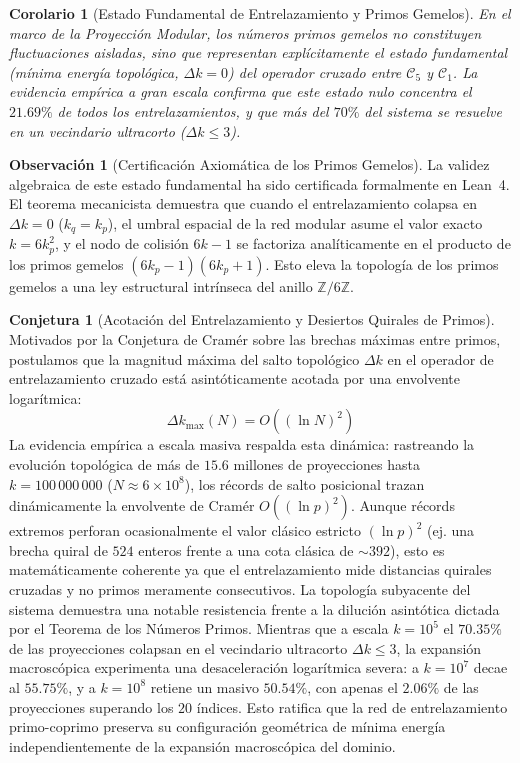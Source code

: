 \documentclass{article}
\numberwithin{equation}{section}
\theoremstyle{plain}
\newtheorem{corollary}[theorem]{Corolario}
\theoremstyle{definition}
\newtheorem{remark}[theorem]{Observación}
\newtheorem{conjecture}[theorem]{Conjetura}
\begin{document}
\begin{corollary}[Estado Fundamental de Entrelazamiento y Primos Gemelos]
\label{cor:estado-fundamental-gemelos}
En el marco de la Proyección Modular, los números primos gemelos no constituyen fluctuaciones aisladas, sino que representan explícitamente el \textit{estado fundamental} (mínima energía topológica, $\Delta k = 0$) del operador cruzado entre $\mathcal{C}_5$ y $\mathcal{C}_1$. La evidencia empírica a gran escala confirma que este estado nulo concentra el $21.69\%$ de todos los entrelazamientos, y que más del $70\%$ del sistema se resuelve en un vecindario ultracorto ($\Delta k \le 3$).
\end{corollary}

\begin{remark}[Certificación Axiomática de los Primos Gemelos]
La validez algebraica de este estado fundamental ha sido certificada formalmente en Lean~4. El teorema mecanicista demuestra que cuando el entrelazamiento colapsa en $\Delta k = 0$ ($k_q = k_p$), el umbral espacial de la red modular asume el valor exacto $k = 6k_p^2$, y el nodo de colisión $6k-1$ se factoriza analíticamente en el producto de los primos gemelos $(6k_p-1)(6k_p+1)$. Esto eleva la topología de los primos gemelos a una ley estructural intrínseca del anillo $\mathbb{Z}/6\mathbb{Z}$.
\end{remark}

\begin{conjecture}[Acotación del Entrelazamiento y Desiertos Quirales de Primos]
\label{conj:cramer-entrelazamiento}
Motivados por la Conjetura de Cramér sobre las brechas máximas entre primos, postulamos que la magnitud máxima del salto topológico $\Delta k$ en el operador de entrelazamiento cruzado está asintóticamente acotada por una envolvente logarítmica:
\begin{equation}
\Delta k_{\max}(N) = O\left((\ln N)^2\right)
\end{equation}
La evidencia empírica a escala masiva respalda esta dinámica: rastreando la evolución topológica de más de $15.6$ millones de proyecciones hasta $k = 100\,000\,000$ ($N \approx 6 \times 10^8$), los récords de salto posicional trazan dinámicamente la envolvente de Cramér $O((\ln p)^2)$. Aunque récords extremos perforan ocasionalmente el valor clásico estricto $(\ln p)^2$ (ej. una brecha quiral de $524$ enteros frente a una cota clásica de $\sim 392$), esto es matemáticamente coherente ya que el entrelazamiento mide distancias quirales cruzadas y no primos meramente consecutivos. La topología subyacente del sistema demuestra una notable resistencia frente a la dilución asintótica dictada por el Teorema de los Números Primos. Mientras que a escala $k=10^5$ el $70.35\%$ de las proyecciones colapsan en el vecindario ultracorto $\Delta k \le 3$, la expansión macroscópica experimenta una desaceleración logarítmica severa: a $k=10^7$ decae al $55.75\%$, y a $k=10^8$ retiene un masivo $50.54\%$, con apenas el $2.06\%$ de las proyecciones superando los $20$ índices. Esto ratifica que la red de entrelazamiento primo-coprimo preserva su configuración geométrica de mínima energía independientemente de la expansión macroscópica del dominio.
\end{conjecture}
\end{document}
